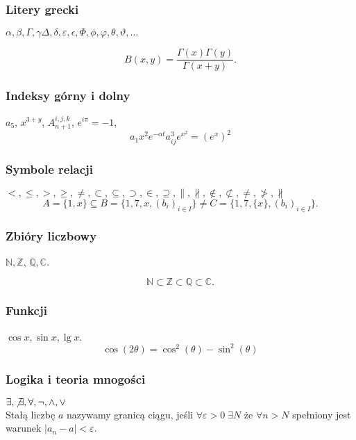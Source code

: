 \documentclass[a4paper, 12pt]{amsart}
\begin{document}
\subsubsection{Litery grecki}
$\alpha, \beta, \Gamma, \gamma \Delta, \delta, \varepsilon, \epsilon, \Phi, \phi, \varphi, \theta, \vartheta, \dots$

\begin{equation*}
B(x,y)=\frac{\Gamma(x)\Gamma(y)}{\Gamma(x+y)}.
\end{equation*}

\subsubsection{Indeksy górny i dolny}
$a_5$, $x^{3+y}$, $A^{i,j,k}_{n+1}$, $e^{i\pi}=-1$,
$$
a_{1} x^{2} e^{-\alpha t}
a^{3}_{ij} e^{x^2} = \left({e^x}\right)^2
$$
\subsubsection{Symbole relacji}
$<,\leq, >, \geq, \neq, \subset, \subseteq, \supset, \in, \supseteq, \parallel, \not\parallel , \not\in, \not\subset, \not =, \not >, \nparallel$
\begin{equation*}
A=\{1,x\}\subseteq B=\{1,7,x, (b_i)_{i\in I}\}\neq C=\{1,7,\{x\}, (b_i)_{i\in I}\}.
\end{equation*}

\subsubsection{Zbióry liczbowy}
$\mathbb N, \mathbb Z$, $\mathbb Q, \mathbb C$.

\begin{equation*}
\mathbb N\subset \mathbb Z\subset\mathbb Q\subset \mathbb C.
\end{equation*}

\subsubsection {Funkcji}
$\cos x, \sin x, \lg x$.
$$
\cos(2 \theta) = \cos^2(\theta)-\sin^2(\theta)
$$

\subsubsection{Logika i teoria mnogości}
$\exists, \not\exists, \forall, \neg, \land, \lor$\\
Stałą liczbę $a$ nazywamy granicą ciągu, jeśli
$\forall\varepsilon>0\; \exists N$ \.ze $\forall n>N$ spełniony jest warunek $|a_n-a|<\varepsilon$.
\end{document}
